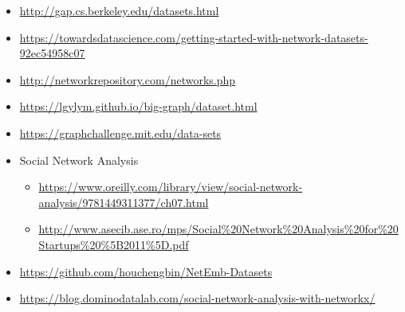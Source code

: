 \begin{itemize}
    \item \url{http://gap.cs.berkeley.edu/datasets.html}
    \item \url{https://towardsdatascience.com/getting-started-with-network-datasets-92ec54958c07}
    \item \url{http://networkrepository.com/networks.php}
    \item \url{https://lgylym.github.io/big-graph/dataset.html}
    \item \url{https://graphchallenge.mit.edu/data-sets}
    \item Social Network Analysis
    \begin{itemize}
        \item \url{https://www.oreilly.com/library/view/social-network-analysis/9781449311377/ch07.html}
        \item \url{http://www.asecib.ase.ro/mps/Social%20Network%20Analysis%20for%20Startups%20%5B2011%5D.pdf}
    \end{itemize}
    \item \url{https://github.com/houchengbin/NetEmb-Datasets}
    \item \url{https://blog.dominodatalab.com/social-network-analysis-with-networkx/}
\end{itemize}